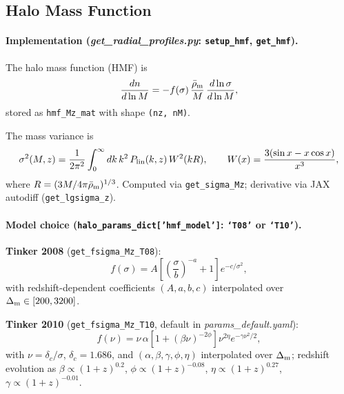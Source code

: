 \documentclass[12pt,a4paper]{article}
\newcommand{\code}[1]{\texttt{\small #1}}
\newcommand{\param}[1]{\texttt{\small #1}}
\newcommand{\file}[1]{\textit{\small #1}}
\begin{document}
\subsection{Halo Mass Function}
\label{sec:hmf}

\paragraph{Implementation (\file{get\_radial\_profiles.py}: \code{setup\_hmf}, \code{get\_hmf}).}
The halo mass function (HMF) is
\begin{equation}
  \frac{dn}{d\ln M} = -f(\sigma)\,\frac{\bar\rho_{\rm m}}{M}\,
  \frac{d\ln\sigma}{d\ln M},
\end{equation}
stored as \code{hmf\_Mz\_mat} with shape \code{(nz, nM)}.

The mass variance is
\begin{equation}
  \sigma^2(M,z) = \frac{1}{2\pi^2}\int_0^\infty dk\,k^2\,
  P_{\rm lin}(k,z)\,W^2(kR),
  \qquad W(x) = \frac{3(\sin x - x\cos x)}{x^3},
\end{equation}
where $R = (3M/4\pi\bar\rho_{\rm m})^{1/3}$. Computed via
\code{get\_sigma\_Mz}; derivative via JAX autodiff (\code{get\_lgsigma\_z}).

\paragraph{Model choice (\param{halo\_params\_dict['hmf\_model']}: \code{`T08'} or \code{`T10'}).}

\textbf{Tinker 2008} \citep{Tinker2008} (\code{get\_fsigma\_Mz\_T08}):
\begin{equation}
  f(\sigma) = A\left[\left(\frac{\sigma}{b}\right)^{-a}+1\right]
  e^{-c/\sigma^2},
\end{equation}
with redshift-dependent coefficients $(A,a,b,c)$ interpolated over
$\Delta_{\rm m}\in[200,3200]$.

\textbf{Tinker 2010} \citep{Tinker2010} (\code{get\_fsigma\_Mz\_T10}, default in
\file{params\_default.yaml}):
\begin{equation}
  f(\nu) = \nu\,\alpha\left[1+(\beta\nu)^{-2\phi}\right]\nu^{2\eta}
  e^{-\gamma\nu^2/2},
\end{equation}
with $\nu=\delta_c/\sigma$, $\delta_c=1.686$, and
$(\alpha,\beta,\gamma,\phi,\eta)$ interpolated over $\Delta_{\rm m}$; redshift
evolution as $\beta\propto(1+z)^{0.2}$, $\phi\propto(1+z)^{-0.08}$,
$\eta\propto(1+z)^{0.27}$, $\gamma\propto(1+z)^{-0.01}$.
\end{document}
